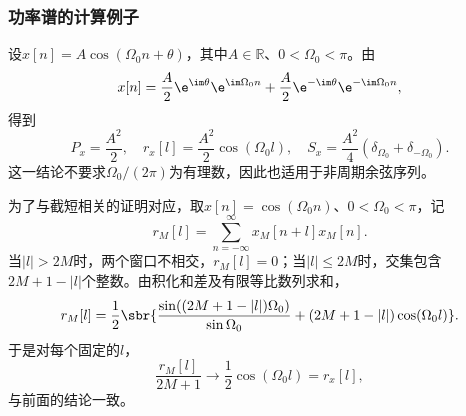 \subsubsection{功率谱的计算例子}

\begin{example}[余弦序列的功率谱]
    设$x[n]=A\cos(\Omega_0n+\theta)$，其中$A\in\mathbb{R}$、$0<\Omega_0<\pi$。由
    \begin{equation}
        x[n]=\frac{A}{2}\e^{\im\theta}\e^{\im\Omega_0n}+\frac{A}{2}\e^{-\im\theta}\e^{-\im\Omega_0n},
    \end{equation}
    得到
    \begin{equation}
        P_x=\frac{A^2}{2},\quad
        r_x[l]=\frac{A^2}{2}\cos(\Omega_0l),\quad
        S_x=\frac{A^2}{4}(\delta_{\Omega_0}+\delta_{-\Omega_0}).
    \end{equation}
    这一结论不要求$\Omega_0/(2\pi)$为有理数，因此也适用于非周期余弦序列。
\end{example}

为了与截短相关的证明对应，取$x[n]=\cos(\Omega_0n)$、$0<\Omega_0<\pi$，记
\begin{equation}
    r_M[l]=\sum_{n=-\infty}^{\infty}x_M[n+l]x_M[n].
\end{equation}
当$|l|>2M$时，两个窗口不相交，$r_M[l]=0$；当$|l|\leq 2M$时，交集包含$2M+1-|l|$个整数。由积化和差及有限等比数列求和，
\begin{equation}
    r_M[l]=\frac{1}{2}\sbr{\frac{\sin((2M+1-|l|)\Omega_0)}{\sin\Omega_0}+(2M+1-|l|)\cos(\Omega_0l)}.
\end{equation}
于是对每个固定的$l$，
\begin{equation}
    \frac{r_M[l]}{2M+1}\longrightarrow\frac{1}{2}\cos(\Omega_0l)=r_x[l],
\end{equation}
与前面的结论一致。
